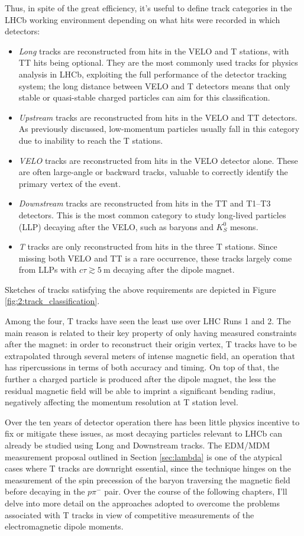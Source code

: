 Thus, in spite of the great efficiency, it's useful to define track categories in the LHCb working environment depending on what hits were recorded in which detectors:
\begin{itemize}
	\item \textit{Long} tracks are reconstructed from hits in the VELO and T stations, with TT hits being optional. They are the most commonly used tracks for physics analysis in LHCb, exploiting the full performance of the detector tracking system; the long distance between VELO and T detectors means that only stable or quasi-stable charged particles can aim for this classification.
	\item \textit{Upstream} tracks are reconstructed from hits in the VELO and TT detectors. As previously discussed, low-momentum particles usually fall in this category due to inability to reach the T stations.
	\item \textit{VELO} tracks are reconstructed from hits in the VELO detector alone. These are often large-angle or backward tracks, valuable to correctly identify the primary vertex of the event.
	\item \textit{Downstream} tracks are reconstructed from hits in the TT and T1--T3 detectors. This is the most common category to study long-lived particles (LLP) decaying after the VELO, such as \lz baryons and $K_S^0$ mesons.
	\item \textit{T} tracks are only reconstructed from hits in the three T stations. Since missing both VELO and TT is a rare occurrence, these tracks largely come from LLPs with $c\tau \gtrsim \SI{5}{\meter}$ decaying after the dipole magnet.
\end{itemize}
Sketches of tracks satisfying the above requirements are depicted in Figure \ref{fig:2:track_classification}.

Among the four, T tracks have seen the least use over LHC Runs 1 and 2.
The main reason is related to their key property of only having measured constraints after the magnet:
in order to reconstruct their origin vertex, T tracks have to be extrapolated through several meters of intense magnetic field, an operation that has ripercussions in terms of both accuracy and timing.
On top of that, the further a charged particle is produced after the dipole magnet, the less the residual magnetic field will be able to imprint a significant bending radius, negatively affecting the momentum resolution at T station level.

Over the ten years of detector operation there has been little physics incentive to fix or mitigate these issues, as most decaying particles relevant to LHCb can already be studied using Long and Downstream tracks.
The \lz EDM/MDM measurement proposal outlined in Section \ref{sec:lambda} is one of the atypical cases where T tracks are downright essential, since the technique hinges on the measurement of the spin precession of the baryon traversing the magnetic field before decaying in the $p\pi^-$ pair.
Over the course of the following chapters, I'll delve into more detail on the approaches adopted to overcome the problems associated with T tracks in view of competitive measurements of the \lz electromagnetic dipole moments.


